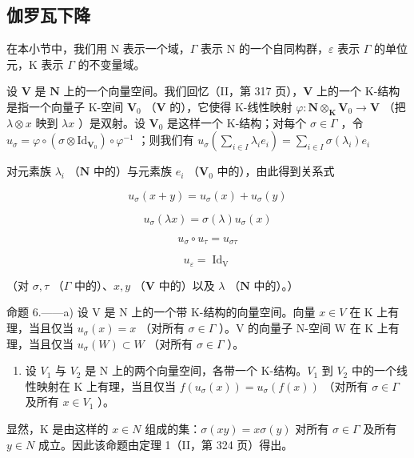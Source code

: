 \subsection{伽罗瓦下降}

在本小节中，我们用 N 表示一个域，\(\Gamma\) 表示 N 的一个自同构群，\(\varepsilon\) 表示 \(\Gamma\) 的单位元，K 表示 \(\Gamma\) 的不变量域。

设 \(\mathbf{V}\) 是 \(\mathbf{N}\) 上的一个向量空间。我们回忆（II，第 317 页），\(\mathbf{V}\) 上的一个 K-结构是指一个向量子 K-空间 \(\mathbf{V}_0\) （\(\mathbf{V}\) 的），它使得 K-线性映射 \(\varphi: \mathbf{N} \otimes_{\mathbf{K}} \mathbf{V}_0 \to \mathbf{V}\) （把 \(\lambda \otimes x\) 映到 \(\lambda x\) ）是双射。设 \(\mathbf{V}_0\) 是这样一个 K-结构；对每个 \(\sigma \in \Gamma\) ，令 \(u_\sigma = \varphi \circ (\sigma \otimes \mathrm{Id}_{\mathbf{V}_0}) \circ \varphi^{-1}\) ；则我们有 \(u_\sigma \left( \sum_{i \in I} \lambda_i e_i \right) = \sum_{i \in I} \sigma(\lambda_i) e_i\)

对元素族 \(\lambda_{i}\) （\(\mathbf{N}\) 中的）与元素族 \(e_i\) （\(\mathbf{V}_0\) 中的），由此得到关系式

\[
u _ {\sigma} (x + y) = u _ {\sigma} (x) + u _ {\sigma} (y)\tag{1}
\]

\[
u _ {\sigma} (\lambda x) = \sigma (\lambda) u _ {\sigma} (x)\tag{2}
\]

\[
u _ {\sigma} \circ u _ {\tau} = u _ {\sigma \tau}\tag{3}
\]

\[
u _ {\varepsilon} = \operatorname{Id} _ {\mathrm{V}}\tag{4}
\]

（对 \(\sigma, \tau\) （\(\Gamma\) 中的）、\(x, y\) （\(\mathbf{V}\) 中的）以及 \(\lambda\) （\(\mathbf{N}\) 中的）。）

命题 6.——a) 设 V 是 N 上的一个带 K-结构的向量空间。向量 \(x \in V\) 在 K 上有理，当且仅当 \(u_{\sigma}(x) = x\) （对所有 \(\sigma \in \Gamma\) ）。V 的向量子 N-空间 W 在 K 上有理，当且仅当 \(u_{\sigma}(W) \subset W\) （对所有 \(\sigma \in \Gamma\) ）。

\begin{enumerate}
\def\labelenumi{\alph{enumi})}
\setcounter{enumi}{1}
\tightlist
\item
  设 \(V_{1}\) 与 \(V_{2}\) 是 N 上的两个向量空间，各带一个 K-结构。\(V_{1}\) 到 \(V_{2}\) 中的一个线性映射在 K 上有理，当且仅当 \(f(u_{\sigma}(x)) = u_{\sigma}(f(x))\) （对所有 \(\sigma \in \Gamma\) 及所有 \(x \in V_{1}\) ）。
\end{enumerate}

显然，K 是由这样的 \(x \in N\) 组成的集：\(\sigma(xy) = x\sigma(y)\) 对所有 \(\sigma \in \Gamma\) 及所有 \(y \in N\) 成立。因此该命题由定理 1（II，第 324 页）得出。

